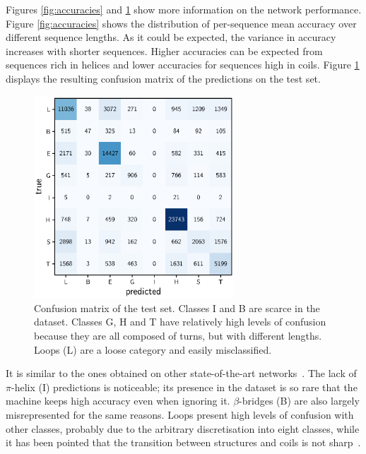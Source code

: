 \documentclass{article}
\begin{document}
Figures \ref{fig:accuracies} and \ref{fig:confusion} show more information on the network performance.
Figure \ref{fig:accuracies} shows the distribution of per-sequence mean accuracy over different sequence lengths.
As it could be expected, the variance in accuracy increases with shorter sequences.
Higher accuracies can be expected from sequences rich in helices and lower accuracies for sequences high in coils.
Figure \ref{fig:confusion} displays the resulting confusion matrix of the predictions on the test set.
\begin{figure}[t]
	\centering
	\centerline{\includegraphics[width=7.5cm]{confusion}}
	\caption{Confusion matrix of the test set.
		Classes I and B are scarce in the dataset. Classes G, H and T have relatively high levels of confusion because they are all composed of turns, but with different lengths. Loops (L) are a loose category and easily misclassified.}
	\label{fig:confusion}
\end{figure}
It is similar to the ones obtained on other state-of-the-art networks~\cite{Fang2017}.
The lack of $\pi$-helix (I) predictions is noticeable; its presence in the dataset is so rare that the machine keeps high accuracy even when ignoring it.
$\beta$-bridges (B) are also largely misrepresented for the same reasons.
Loops present high levels of confusion with other classes, probably due to the arbitrary discretisation into eight classes, while it has been pointed that the transition between structures and coils is not sharp~\cite{Rost2001}.
\end{document}
